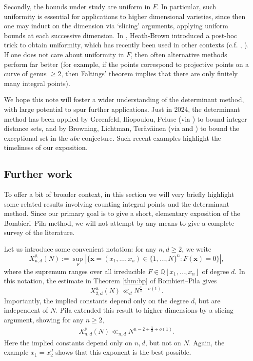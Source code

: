 \documentclass[12pt]{amsart}
\newcommand{\1}{{\mathbf 1}}
\theoremstyle{remark}
\theoremstyle{definition}
\begin{document}
Secondly, the bounds under study are uniform in $F$. In particular, such uniformity is essential for applications to higher dimensional varieties, since then one may induct on the dimension  via  `slicing' arguments, applying uniform bounds at each successive dimension. In \cite{HB02}, Heath-Brown introduced a post-hoc trick to obtain uniformity, which has recently been used in other contexts (c.f. \cite{BoB20}, \cite{BoP22}). If one does not care about uniformity in $F$, then often alternative methods perform far better (for example, if the points correspond to projective points on a curve of genus $\geq 2$, then Faltings' theorem \cite{Fal83} implies that there are only finitely many integral points).

We hope this note will foster a wider understanding of the determinant method, with large potential to spur further applications. Just in 2024, the determinant method has been applied by Greenfeld, Iliopoulou, Peluse \cite{GIP24} (via \cite{CCDN20}) to bound integer distance sets, and by Browning, Lichtman, Ter\"av\"ainen \cite{BLT24} (via \cite{BP89} and \cite{HB02}) to bound the exceptional set in the $abc$ conjecture. Such recent examples highlight the timeliness of our exposition.

\subsection{Further work} 
To offer a bit of broader context, in this section we will very briefly highlight some related results involving counting integral points and the determinant method. Since our primary goal is to give a short, elementary exposition of the Bombieri--Pila method, we will not attempt by any means to give a complete survey of the literature.


Let us introduce some convenient notation: for any $n,d\geq 2$, we write
\[X_{n,d}^{\mathbb{A}}(N) := \sup_{F}\left\lvert \{ \mathbf{x}=(x_1,\ldots,x_n)\in \{1,\ldots,N\}^{n} : F(\mathbf{x})=0\}\right\rvert,\]
where the supremum ranges over all irreducible $F\in \mathbb{Q}[x_1,\ldots,x_n]$ of degree $d$.
In this notation, the estimate in Theorem \ref{thm:bp} of Bombieri--Pila gives
\[X_{2,d}^{\mathbb{A}}(N) \ll_d N^{\frac{1}{d}+o(1)}.\]
Importantly, the implied constants depend only on the degree $d$, but are independent of $N$.
Pila \cite{Pi95} extended this result to higher dimensions by a slicing argument, showing for any $n\ge2$,
\begin{align}\label{eq:Pi95}
X_{n,d}^{\mathbb{A}}(N) \ll_{n,d} N^{n-2+\frac{1}{d}+o(1)}.
\end{align}
Here the implied constants depend only on $n,d$, but not on $N$.
Again, the example $x_1=x_2^d$ shows that this exponent is the best possible.
\end{document}
